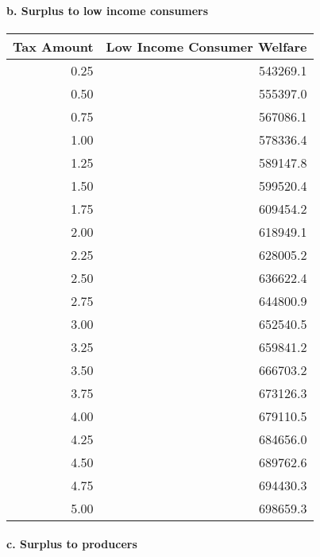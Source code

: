 \documentclass[]{article}
\let\oldparagraph\paragraph
\renewcommand{\paragraph}[1]{\oldparagraph{#1}\mbox{}}
\begin{document}
\paragraph{b. Surplus to low income
consumers}\label{b.-surplus-to-low-income-consumers}

\begin{table}[H]
\centering
\begin{tabular}{r|r}
\hline
Tax Amount & Low Income Consumer Welfare\\
\hline
0.25 & 543269.1\\
\hline
0.50 & 555397.0\\
\hline
0.75 & 567086.1\\
\hline
1.00 & 578336.4\\
\hline
1.25 & 589147.8\\
\hline
1.50 & 599520.4\\
\hline
1.75 & 609454.2\\
\hline
2.00 & 618949.1\\
\hline
2.25 & 628005.2\\
\hline
2.50 & 636622.4\\
\hline
2.75 & 644800.9\\
\hline
3.00 & 652540.5\\
\hline
3.25 & 659841.2\\
\hline
3.50 & 666703.2\\
\hline
3.75 & 673126.3\\
\hline
4.00 & 679110.5\\
\hline
4.25 & 684656.0\\
\hline
4.50 & 689762.6\\
\hline
4.75 & 694430.3\\
\hline
5.00 & 698659.3\\
\hline
\end{tabular}
\end{table}

\paragraph{c. Surplus to producers}\label{c.-surplus-to-producers}
\end{document}
